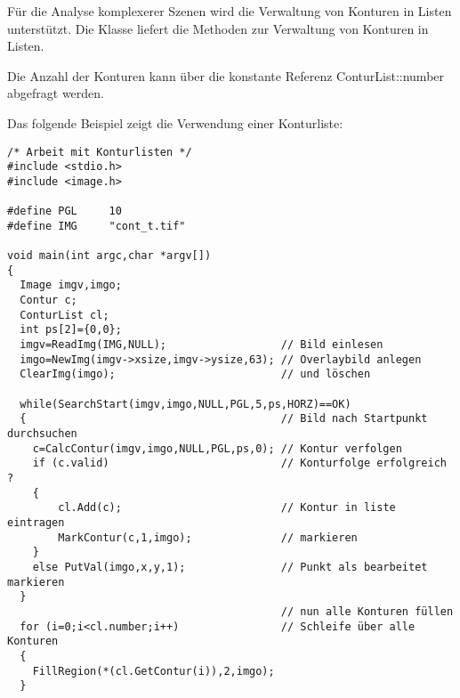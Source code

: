 {Für die Analyse komplexerer Szenen wird die Verwaltung von 
Konturen in Listen unterstützt. Die Klasse  liefert
die Methoden zur Verwaltung von Konturen in Listen.





Die Anzahl der Konturen kann über die konstante Referenz 
ConturList::number abgefragt werden.

Das folgende Beispiel zeigt die Verwendung einer Konturliste:

\begprogr
\begin{verbatim}
/* Arbeit mit Konturlisten */
#include <stdio.h>
#include <image.h>

#define PGL     10
#define IMG     "cont_t.tif"

void main(int argc,char *argv[])
{
  Image imgv,imgo;
  Contur c;
  ConturList cl;
  int ps[2]={0,0};
  imgv=ReadImg(IMG,NULL);                  // Bild einlesen
  imgo=NewImg(imgv->xsize,imgv->ysize,63); // Overlaybild anlegen
  ClearImg(imgo);                          // und löschen

  while(SearchStart(imgv,imgo,NULL,PGL,5,ps,HORZ)==OK)
  {                                        // Bild nach Startpunkt durchsuchen
    c=CalcContur(imgv,imgo,NULL,PGL,ps,0); // Kontur verfolgen 
    if (c.valid)                           // Konturfolge erfolgreich ?
    {
        cl.Add(c);                         // Kontur in liste eintragen
        MarkContur(c,1,imgo);              // markieren 
    }
    else PutVal(imgo,x,y,1);               // Punkt als bearbeitet markieren
  }
                                           // nun alle Konturen füllen
  for (i=0;i<cl.number;i++)                // Schleife über alle Konturen
  {
    FillRegion(*(cl.GetContur(i)),2,imgo);
  }


\end{verbatim}}
